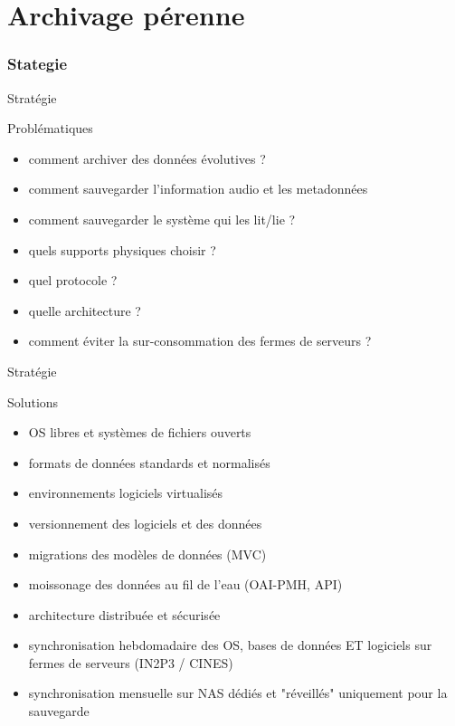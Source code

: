 \documentclass[final, hyperref, table]{beamer}
\begin{document}


\section{Archivage pérenne}

\subsubsection{Stategie}
\begin{frame}{Stratégie}

  \begin{block}{Problématiques}%
    \begin{itemize}
    \item comment archiver des données évolutives ?
    \item comment sauvegarder l'information audio et les metadonnées
    \item comment sauvegarder le système qui les lit/lie ?
    \item quels supports physiques choisir ?
    \item quel protocole ?
    \item quelle architecture ?
    \item comment éviter la sur-consommation des fermes de serveurs ?
    \end{itemize}
  \end{block}

\end{frame}

\begin{frame}{Stratégie}
  \begin{block}{Solutions}%
    \begin{itemize}
    \item OS libres et systèmes de fichiers ouverts
    \item formats de données standards et normalisés
    \item environnements logiciels virtualisés
    \item versionnement des logiciels et des données
    \item migrations des modèles de données (MVC)
    \item moissonage des données au fil de l'eau (OAI-PMH, API)
    \item architecture distribuée et sécurisée
    \item synchronisation hebdomadaire des OS, bases de données ET logiciels sur fermes de serveurs (IN2P3 / CINES)
    \item synchronisation mensuelle sur NAS dédiés et "réveillés" uniquement pour la sauvegarde
    \end{itemize}
  \end{block}

\end{frame}
\end{document}
